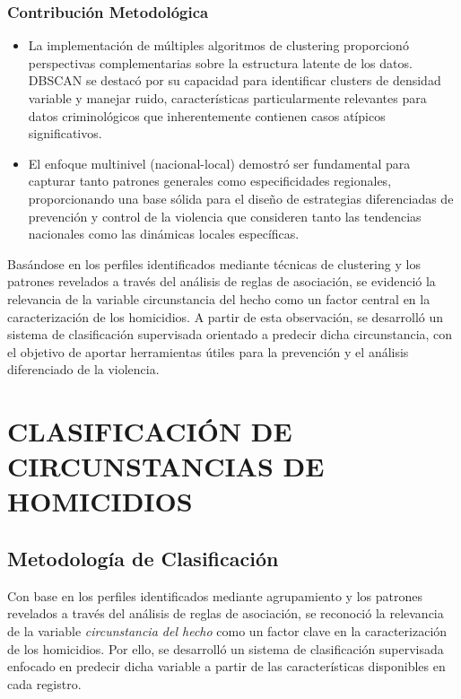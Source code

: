 \documentclass[lettersize,journal]{IEEEtran}
\begin{document}
\subsubsection{Contribución Metodológica}

\begin{itemize}
    \item La implementación de múltiples algoritmos de clustering proporcionó perspectivas complementarias sobre la estructura latente de los datos. DBSCAN se destacó por su capacidad para identificar clusters de densidad variable y manejar ruido, características particularmente relevantes para datos criminológicos que inherentemente contienen casos atípicos significativos.
    
    \item El enfoque multinivel (nacional-local) demostró ser fundamental para capturar tanto patrones generales como especificidades regionales, proporcionando una base sólida para el diseño de estrategias diferenciadas de prevención y control de la violencia que consideren tanto las tendencias nacionales como las dinámicas locales específicas.
\end{itemize}

Basándose en los perfiles identificados mediante técnicas de clustering y los patrones revelados a través del análisis de reglas de asociación, se evidenció la relevancia de la variable circunstancia del hecho como un factor central en la caracterización de los homicidios. A partir de esta observación, se desarrolló un sistema de clasificación supervisada orientado a predecir dicha circunstancia, con el objetivo de aportar herramientas útiles para la prevención y el análisis diferenciado de la violencia.

\section{CLASIFICACIÓN DE CIRCUNSTANCIAS DE HOMICIDIOS}
\label{sec:clasificacion}

\subsection{Metodología de Clasificación}
Con base en los perfiles identificados mediante agrupamiento y los patrones revelados a través del análisis de reglas de asociación, se reconoció la relevancia de la variable \textit{circunstancia del hecho} como un factor clave en la caracterización de los homicidios. Por ello, se desarrolló un sistema de clasificación supervisada enfocado en predecir dicha variable a partir de las características disponibles en cada registro.
\end{document}
